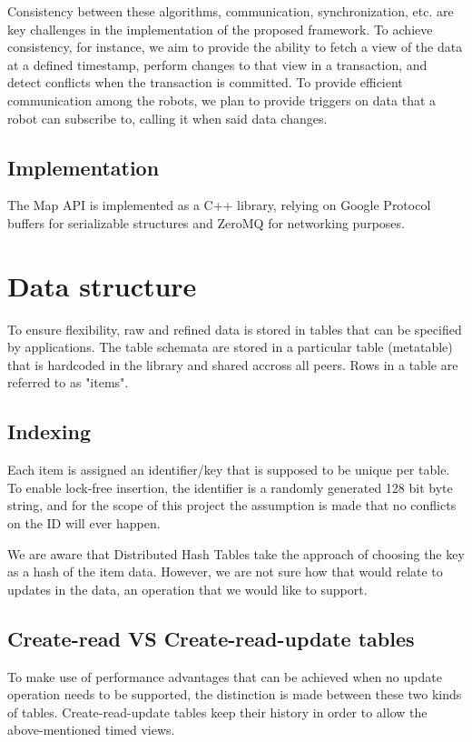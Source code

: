 \documentclass[a4paper, 10pt, conference]{ieeeconf}
\begin{document}
Consistency between these algorithms, communication, synchronization, etc. are
key challenges in the implementation of the proposed framework. To achieve
consistency, for instance, we aim to provide the ability to fetch a view of the
data at a defined timestamp, perform changes to that view in a transaction, and
detect conflicts when the transaction is committed. To provide efficient
communication among the robots, we plan to provide triggers on data that a
robot can subscribe to, calling it when said data changes.

\subsection{Implementation}

The Map API is implemented as a C++ library, relying on Google Protocol buffers
for serializable structures and ZeroMQ for networking purposes.

\section{Data structure}

To ensure flexibility, raw and refined data is stored in tables that can be 
specified by applications. The table schemata are stored in a particular table 
(metatable) that is hardcoded in the library and shared accross all peers. Rows
in a table are referred to as "items".

\subsection{Indexing}

Each item is assigned an identifier/key that is supposed to be unique per table.
To enable lock-free insertion, the identifier is a randomly generated 128 bit 
byte string, and for the scope of this project the assumption is made that no
conflicts on the ID will ever happen.

We are aware that Distributed Hash Tables take the approach of choosing the key
as a hash of the item data. However, we are not sure how that would relate to
updates in the data, an operation that we would like to support.

\subsection{Create-read VS Create-read-update tables}

To make use of performance advantages that can be achieved when no update
operation needs to be supported, the distinction is made between these two
kinds of tables. Create-read-update tables keep their history in order to
allow the above-mentioned timed views.
\end{document}
